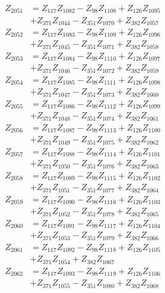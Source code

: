 \begin{multicols}{2}
\begin{align}
Z_{2051} &= Z_{117}Z_{1082} - Z_{98}Z_{1108} + Z_{126}Z_{1095}  \nonumber \\
&+ Z_{371}Z_{1044} - Z_{351}Z_{1070} + Z_{382}Z_{1057} \nonumber \\
Z_{2052} &= Z_{117}Z_{1083} - Z_{98}Z_{1109} + Z_{126}Z_{1096}  \nonumber \\
&+ Z_{371}Z_{1045} - Z_{351}Z_{1071} + Z_{382}Z_{1058} \nonumber \\
Z_{2053} &= Z_{117}Z_{1084} - Z_{98}Z_{1110} + Z_{126}Z_{1097}  \nonumber \\
&+ Z_{371}Z_{1046} - Z_{351}Z_{1072} + Z_{382}Z_{1059} \nonumber \\
Z_{2054} &= Z_{117}Z_{1085} - Z_{98}Z_{1111} + Z_{126}Z_{1098}  \nonumber \\
&+ Z_{371}Z_{1047} - Z_{351}Z_{1073} + Z_{382}Z_{1060} \nonumber \\
Z_{2055} &= Z_{117}Z_{1086} - Z_{98}Z_{1112} + Z_{126}Z_{1099}  \nonumber \\
&+ Z_{371}Z_{1048} - Z_{351}Z_{1074} + Z_{382}Z_{1061} \nonumber \\
Z_{2056} &= Z_{117}Z_{1087} - Z_{98}Z_{1113} + Z_{126}Z_{1100}  \nonumber \\
&+ Z_{371}Z_{1049} - Z_{351}Z_{1075} + Z_{382}Z_{1062} \nonumber \\
Z_{2057} &= Z_{117}Z_{1088} - Z_{98}Z_{1114} + Z_{126}Z_{1101}  \nonumber \\
&+ Z_{371}Z_{1050} - Z_{351}Z_{1076} + Z_{382}Z_{1063} \nonumber \\
Z_{2058} &= Z_{117}Z_{1089} - Z_{98}Z_{1115} + Z_{126}Z_{1102}  \nonumber \\
&+ Z_{371}Z_{1051} - Z_{351}Z_{1077} + Z_{382}Z_{1064} \nonumber \\
Z_{2059} &= Z_{117}Z_{1090} - Z_{98}Z_{1116} + Z_{126}Z_{1103}  \nonumber \\
&+ Z_{371}Z_{1052} - Z_{351}Z_{1078} + Z_{382}Z_{1065} \nonumber \\
Z_{2060} &= Z_{117}Z_{1091} - Z_{98}Z_{1117} + Z_{126}Z_{1104}  \nonumber \\
&+ Z_{371}Z_{1053} - Z_{351}Z_{1079} + Z_{382}Z_{1066} \nonumber \\
Z_{2061} &= Z_{117}Z_{1092} - Z_{98}Z_{1118} + Z_{126}Z_{1105}  \nonumber \\
&+ Z_{371}Z_{1054} + Z_{382}Z_{1067} \nonumber \\
Z_{2062} &= Z_{117}Z_{1093} - Z_{98}Z_{1119} + Z_{126}Z_{1106}  \nonumber \\
&+ Z_{371}Z_{1055} - Z_{351}Z_{1080} + Z_{382}Z_{1068} \nonumber \\

\end{align}
\end{multicols}
